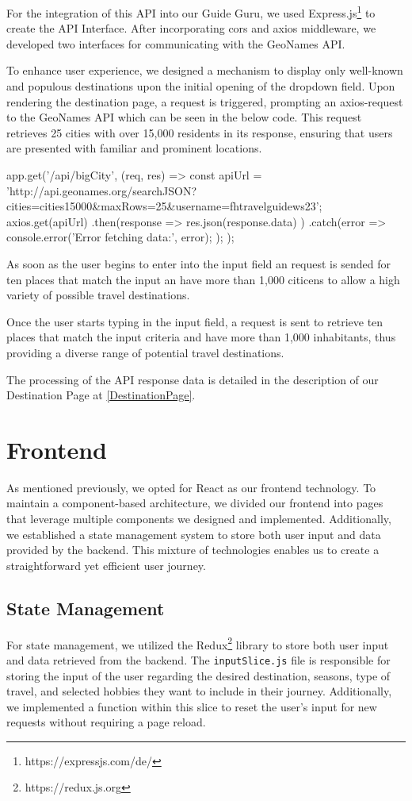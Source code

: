 \documentclass[english,notitlepage,smartquotes]{hgbreport}
\begin{document}
For the integration of this API into our Guide Guru, we used Express.js\footnote{https://expressjs.com/de/} to create the API Interface. After incorporating cors and axios middleware, we developed two interfaces for communicating with the GeoNames API.

To enhance user experience, we designed a mechanism to display only well-known and populous destinations upon the initial opening of the dropdown field. Upon rendering the destination page, a request is triggered, prompting an axios-request to the GeoNames API which can be seen in the below code. This request retrieves 25 cities with over 15,000 residents in its response, ensuring that users are presented with familiar and prominent locations.

\begin{JsCode}
app.get('/api/bigCity', (req, res) => {
	const apiUrl = 'http://api.geonames.org/searchJSON?cities=cities15000&maxRows=25&username=fhtravelguidews23';
	axios.get(apiUrl)
	.then(response => {
		res.json(response.data)
	})
	.catch(error => {
		console.error('Error fetching data:', error);
	});
});
\end{JsCode}

As soon as the user begins to enter into the input field an request is sended for ten places that match the input an have more than 1,000 citicens to allow a high variety of possible travel destinations. 

Once the user starts typing in the input field, a request is sent to retrieve ten places that match the input criteria and have more than 1,000 inhabitants, thus providing a diverse range of potential travel destinations.

The processing of the API response data is detailed in the description of our Destination Page at \ref{DestinationPage}.

\section{Frontend}

As mentioned previously, we opted for React as our frontend technology. To maintain a component-based architecture, we divided our frontend into pages that leverage multiple components we designed and implemented. Additionally, we established a state management system to store both user input and data provided by the backend. This mixture of technologies enables us to create a straightforward yet efficient user journey.

\subsection{State Management}
For state management, we utilized the Redux\footnote{https://redux.js.org} library to store both user input and data retrieved from the backend. The  \texttt{inputSlice.js} file is responsible for storing the input of the user regarding the desired destination, seasons, type of travel, and selected hobbies they want to include in their journey. Additionally, we implemented a function within this slice to reset the user's input for new requests without requiring a page reload.
\end{document}

